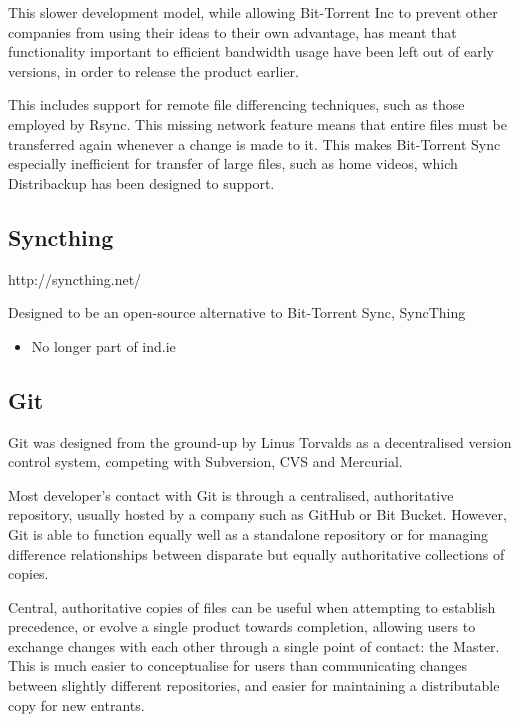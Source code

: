 \documentclass[12pt,a4paper,]{adreport}
\begin{document}
This slower development model, while allowing Bit-Torrent Inc to prevent
other companies from using their ideas to their own advantage, has meant
that functionality important to efficient bandwidth usage have been left
out of early versions, in order to release the product earlier.

This includes support for remote file differencing techniques, such as
those employed by Rsync. This missing network feature means that entire
files must be transferred again whenever a change is made to it. This
makes Bit-Torrent Sync especially inefficient for transfer of large
files, such as home videos, which Distribackup has been designed to
support.

\subsection{Syncthing}\label{syncthing}

http://syncthing.net/

Designed to be an open-source alternative to Bit-Torrent Sync, SyncThing

\begin{itemize}
\itemsep1pt\parskip0pt
\item
  No longer part of ind.ie
\end{itemize}

\subsection{Git}\label{git}

Git was designed from the ground-up by Linus Torvalds as a decentralised
version control system, competing with Subversion, CVS and Mercurial.

Most developer's contact with Git is through a centralised,
authoritative repository, usually hosted by a company such as GitHub or
Bit Bucket. However, Git is able to function equally well as a
standalone repository or for managing difference relationships between
disparate but equally authoritative collections of copies.

Central, authoritative copies of files can be useful when attempting to
establish precedence, or evolve a single product towards completion,
allowing users to exchange changes with each other through a single
point of contact: the Master. This is much easier to conceptualise for
users than communicating changes between slightly different
repositories, and easier for maintaining a distributable copy for new
entrants.
\end{document}
